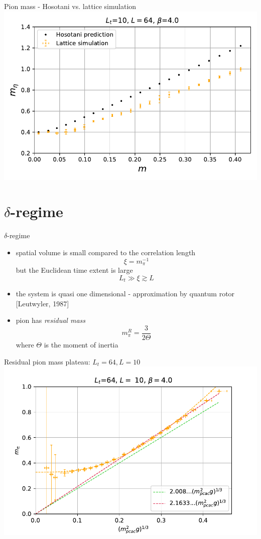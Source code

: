 \documentclass[english]{beamer}
\begin{document}
\begin{frame}{Pion mass - Hosotani vs. lattice simulation}
  \includegraphics[width=1\textwidth]{figs/Meta64x10FiniteT}
\end{frame}


\section{$\delta$-regime}

\begin{frame}{$\delta$-regime}
  \begin{itemize}
    \item spatial volume is small compared to the correlation
      length
      \[
        \xi = m_\pi^{-1}
      \]
      but the Euclidean time extent is large
      \[
        L_t\gg \xi \gtrsim L
      \]
    \item the system is quasi one dimensional - approximation by
      quantum rotor [Leutwyler, 1987]
    \item pion has \textit{residual mass}
      \[
        m_\pi^R = \frac{3}{2\Theta}
      \]
      where $\Theta$ is the moment of inertia
  \end{itemize}
\end{frame}

\begin{frame}{Residual pion mass plateau: $L_t = 64, L = 10$}
  \includegraphics[width=1\textwidth]{figs/Mpi10x64}
\end{frame}
\end{document}
